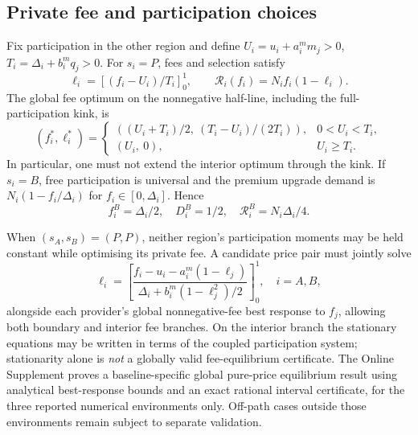\documentclass[11pt]{article}
\begin{document}
\subsection{Private fee and participation choices}
Fix participation in the other region and define $U_i=u_i+a_i^m m_j>0$, $T_i=\Delta_i+b_i^m q_j>0$. For $s_i=P$, fees and selection satisfy
\begin{equation}
 \ell_i=[(f_i-U_i)/T_i]_0^1,\qquad
 \mathcal R_i(f_i)=N_i f_i(1-\ell_i).
\end{equation}
The global fee optimum on the nonnegative half-line, including the full-participation kink, is
\begin{equation}
 (f_i^*,\ell_i^*)=
 \begin{cases}
 ((U_i+T_i)/2,\ (T_i-U_i)/(2T_i)),&0<U_i<T_i,\\[2mm]
 (U_i,\ 0),&U_i\geq T_i.
 \end{cases}\label{eq:monopolyfee}
\end{equation}
In particular, one must not extend the interior optimum through the kink. If $s_i=B$, free participation is universal and the premium upgrade demand is $N_i(1-f_i/\Delta_i)$ for $f_i\in[0,\Delta_i]$. Hence
\begin{equation}
 f_i^B=\Delta_i/2,\quad D_i^B=1/2,\quad
 \mathcal R_i^B=N_i\Delta_i/4.
 \label{eq:coexist}
\end{equation}

When $(s_A,s_B)=(P,P)$, neither region's participation moments may be held constant while optimising its private fee. A candidate price pair must jointly solve
\begin{equation}
 \ell_i=\left[\frac{f_i-u_i-a_i^m(1-\ell_j)}
 {\Delta_i+b_i^m(1-\ell_j^2)/2}\right]_0^1,\quad i=A,B,
 \label{eq:pp-fixedpoint}
\end{equation}
alongside each provider's global nonnegative-fee best response to $f_j$, allowing both boundary and interior fee branches. On the interior branch the stationary equations may be written in terms of the coupled participation system; stationarity alone is \emph{not} a globally valid fee-equilibrium certificate. The Online Supplement proves a baseline-specific global pure-price equilibrium result using analytical best-response bounds and an exact rational interval certificate, for the three reported numerical environments only. Off-path cases outside those environments remain subject to separate validation.
\end{document}
